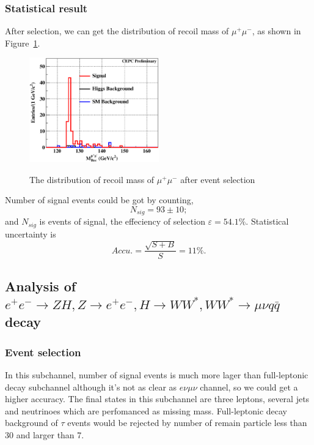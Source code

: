 \documentclass[11pt,a4paper]{cepcnote}
\begin{document}
\subsubsection{Statistical result}
After selection, we can get the distribution of recoil mass of $\mu^+\mu^-$, as shown in Figure~\ref{fig:uuhevuvrecfit}.
\begin{figure}[H]
\centering
\includegraphics[width=0.5\textwidth]{e2e2H/evuv/uuh_recfit}
\label{fig:uuhevuvrecfit}
\caption[]{The distribution of recoil mass of $\mu^+\mu^-$ after event selection}
\end{figure}

Number of signal events could be got by counting,
\begin{equation*}
N_{sig} = 93\pm10 ;
\end{equation*}
and $N_{sig}$ is events of signal, the effeciency of selection $\varepsilon = 54.1\%$. Statistical uncertainty is 
\begin{equation*}
Accu.=\frac{\sqrt{S+B}}{S} = 11\%.
\end{equation*}

\subsection{Analysis of $e^+e^-\rightarrow ZH, Z\rightarrow e^+e^-, H\rightarrow WW^*, WW^*\rightarrow \mu\nu q\bar{q}$ decay}
\subsubsection{Event selection}
In this subchannel, number of signal events is much more lager than full-leptonic decay subchannel 
although it's not as clear as $e\nu\mu\nu$ channel,
so we could get a higher accuracy. 
The final states in this subchannel are three leptons, several jets and neutrinoes which are perfomanced as missing mass.
Full-leptonic decay background of $\tau$ events would be rejected by number of remain particle less than 30 and larger than 7. 
\end{document}
